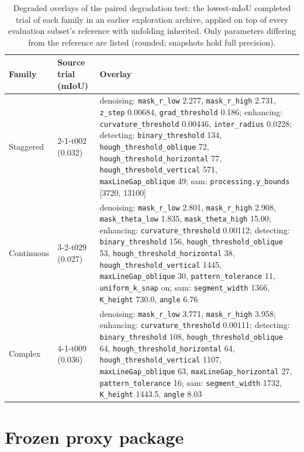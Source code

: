 \documentclass[a4paper,fleqn]{cas-dc}
\begin{document}
\begin{table}[t]
\caption{Degraded overlays of the paired degradation test: the lowest-mIoU completed trial of each family in an earlier exploration archive, applied on top of every evaluation subset's reference with unfolding inherited. Only parameters differing from the reference are listed (rounded; snapshots hold full precision).}
\label{tab:degraded-overlays}
\centering
\small
\begin{tabular*}{\textwidth}{@{\extracolsep{\fill}} l l L{0.62\textwidth} @{}}
\toprule
Family & Source trial (mIoU) & Overlay \\
\midrule
Staggered & 2-1-t002 (0.032) & denoising: \texttt{mask\_r\_low} 2.277, \texttt{mask\_r\_high} 2.731, \texttt{z\_step} 0.00684, \texttt{grad\_threshold} 0.186; enhancing: \texttt{curvature\_threshold} 0.00446, \texttt{inter\_radius} 0.0228; detecting: \texttt{binary\_threshold} 134, \texttt{hough\_threshold\_oblique} 72, \texttt{hough\_threshold\_horizontal} 77, \texttt{hough\_threshold\_vertical} 571, \texttt{maxLineGap\_oblique} 49; sam: \texttt{processing.y\_bounds} [3720, 13100] \\
\addlinespace
Continuous & 3-2-t029 (0.027) & denoising: \texttt{mask\_r\_low} 2.801, \texttt{mask\_r\_high} 2.908, \texttt{mask\_theta\_low} 1.835, \texttt{mask\_theta\_high} 15.00; enhancing: \texttt{curvature\_threshold} 0.00112; detecting: \texttt{binary\_threshold} 156, \texttt{hough\_threshold\_oblique} 53, \texttt{hough\_threshold\_horizontal} 38, \texttt{hough\_threshold\_vertical} 1445, \texttt{maxLineGap\_oblique} 30, \texttt{pattern\_tolerance} 11, \texttt{uniform\_k\_snap} on; sam: \texttt{segment\_width} 1366, \texttt{K\_height} 730.0, \texttt{angle} 6.76 \\
\addlinespace
Complex & 4-1-t009 (0.036) & denoising: \texttt{mask\_r\_low} 3.771, \texttt{mask\_r\_high} 3.958; enhancing: \texttt{curvature\_threshold} 0.00111; detecting: \texttt{binary\_threshold} 108, \texttt{hough\_threshold\_oblique} 64, \texttt{hough\_threshold\_horizontal} 64, \texttt{hough\_threshold\_vertical} 1107, \texttt{maxLineGap\_oblique} 63, \texttt{maxLineGap\_horizontal} 27, \texttt{pattern\_tolerance} 16; sam: \texttt{segment\_width} 1732, \texttt{K\_height} 1443.5, \texttt{angle} 8.03 \\
\bottomrule
\end{tabular*}
\end{table}

\section{Frozen proxy package}\label{app:proxy-package}
\end{document}
